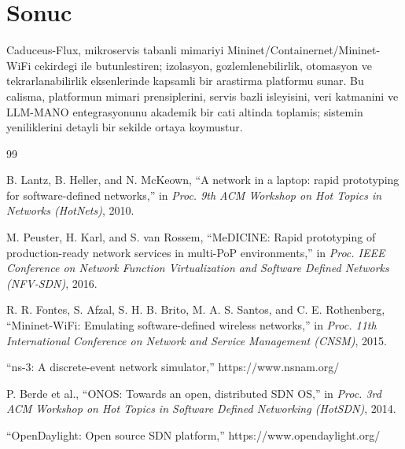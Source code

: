 \documentclass[conference]{IEEEtran}
\begin{document}
\section{Sonuc}
Caduceus-Flux, mikroservis tabanli mimariyi Mininet/Containernet/Mininet-WiFi cekirdegi ile butunlestiren; izolasyon, gozlemlenebilirlik, otomasyon ve tekrarlanabilirlik eksenlerinde kapsamli bir arastirma platformu sunar. Bu calisma, platformun mimari prensiplerini, servis bazli isleyisini, veri katmanini ve LLM-MANO entegrasyonunu akademik bir cati altinda toplamis; sistemin yeniliklerini detayli bir sekilde ortaya koymustur.

\begin{thebibliography}{99}

B. Lantz, B. Heller, and N. McKeown, ``A network in a laptop: rapid prototyping for software-defined networks,'' in \textit{Proc. 9th ACM Workshop on Hot Topics in Networks (HotNets)}, 2010.

M. Peuster, H. Karl, and S. van Rossem, ``MeDICINE: Rapid prototyping of production-ready network services in multi-PoP environments,'' in \textit{Proc. IEEE Conference on Network Function Virtualization and Software Defined Networks (NFV-SDN)}, 2016.

R. R. Fontes, S. Afzal, S. H. B. Brito, M. A. S. Santos, and C. E. Rothenberg, ``Mininet-WiFi: Emulating software-defined wireless networks,'' in \textit{Proc. 11th International Conference on Network and Service Management (CNSM)}, 2015.

``ns-3: A discrete-event network simulator,'' https://www.nsnam.org/

P. Berde et al., ``ONOS: Towards an open, distributed SDN OS,'' in \textit{Proc. 3rd ACM Workshop on Hot Topics in Software Defined Networking (HotSDN)}, 2014.

``OpenDaylight: Open source SDN platform,'' https://www.opendaylight.org/

\end{thebibliography}
\end{document}
